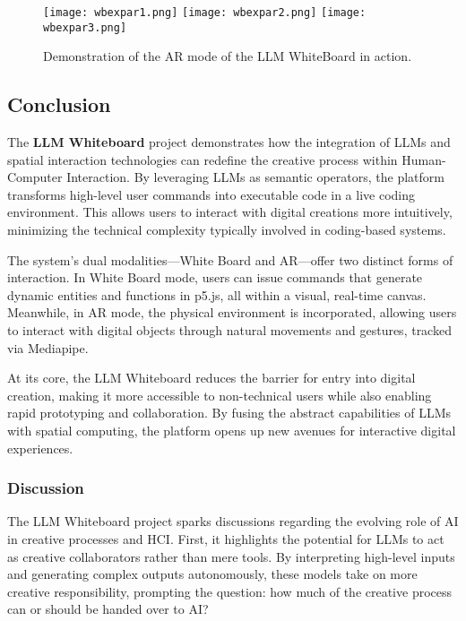 \begin{figure}[h!]
    \centering
    \texttt{[image: wbexpar1.png]}
    \texttt{[image: wbexpar2.png]}
    \texttt{[image: wbexpar3.png]}
    \caption{Demonstration of the AR mode of the LLM WhiteBoard in action.}
    \vspace{0.1cm}
    \label{fig:wbdemo1}
\end{figure}

\subsection{Conclusion}

The \textbf{LLM Whiteboard} project demonstrates how the integration of LLMs and spatial interaction technologies can redefine the creative process within Human-Computer Interaction.
By leveraging LLMs as semantic operators, the platform transforms high-level user commands into executable code in a live coding environment.
This allows users to interact with digital creations more intuitively, minimizing the technical complexity typically involved in coding-based systems.

The system’s dual modalities—White Board and AR—offer two distinct forms of interaction.
In White Board mode, users can issue commands that generate dynamic entities and functions in p5.js, all within a visual, real-time canvas.
Meanwhile, in AR mode, the physical environment is incorporated, allowing users to interact with digital objects through natural movements and gestures, tracked via Mediapipe.

At its core, the LLM Whiteboard reduces the barrier for entry into digital creation, making it more accessible to non-technical users while also enabling rapid prototyping and collaboration.
By fusing the abstract capabilities of LLMs with spatial computing, the platform opens up new avenues for interactive digital experiences.

\subsubsection{Discussion}

The LLM Whiteboard project sparks discussions regarding the evolving role of AI in creative processes and HCI.
First, it highlights the potential for LLMs to act as creative collaborators rather than mere tools.
By interpreting high-level inputs and generating complex outputs autonomously, these models take on more creative responsibility, prompting the question: how much of the creative process can or should be handed over to AI?

